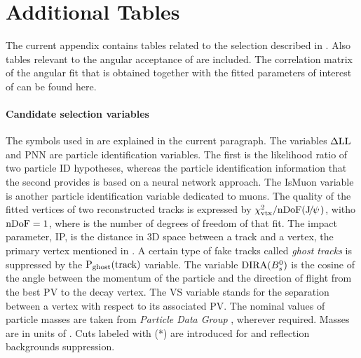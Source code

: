 
\chapter{Additional Tables}
\label{AdditionalTables}

The current appendix contains tables related to the selection described in .
Also tables relevant to the angular acceptance of  are included.
The correlation matrix of the angular fit that is obtained together with the fitted parameters
of interest of  can be found here.

\subsubsection{Candidate selection variables}
The symbols used in  are explained in the current paragraph.
The variables $\rm \Delta LL$ and PNN are particle identification variables. The first is the
likelihood ratio of two particle ID hypotheses, whereas the particle identification information
that the second provides is based on a neural network approach. The IsMuon variable is another
particle identification variable dedicated to muons. The quality of the fitted vertices
of two reconstructed tracks is expressed by $\chi^2_{\rm vtx}/\rm nDoF({J\mskip -3mu/\mskip -2mu\psi\mskip 2mu})$, witho $\rm nDoF=1$, where \nDoF
is the number of degrees of freedom of that fit. The impact parameter, IP, is the distance in
3D space between a track and a vertex, \eg the primary vertex mentioned in .
A certain type of fake tracks called {\it ghost tracks} is suppressed by the $\text{P}_{\rm ghost}(\rm track)$
variable. The variable ${\rm DIRA}(B^0_s)$ is the cosine of the angle between the momentum of the \Bs particle
and the direction of flight from the best PV to the \Bs decay vertex. The VS variable stands for
the separation between a vertex with respect to its associated PV. The nominal values of particle
masses are taken from {\it Particle Data Group} \cite{PDG}, wherever required. Masses are in units
of \mevcc. Cuts labeled with (*) are introduced for \LbJpsipK and \LbJpsippi reflection backgrounds suppression.


